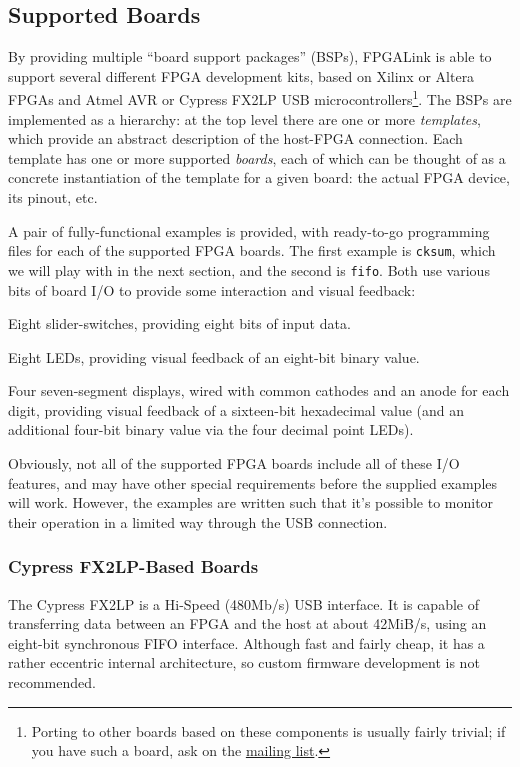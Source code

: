 \subsection{Supported Boards}
By providing multiple ``board support packages'' (BSPs), FPGALink is able to support several different FPGA development kits, based on Xilinx or Altera FPGAs and Atmel AVR or Cypress FX2LP USB microcontrollers\footnote{Porting to other boards based on these components is usually fairly trivial; if you have such a board, ask on the \href{http://groups.google.com/group/fpgalink-users}{mailing list}.}. The BSPs are implemented as a hierarchy: at the top level there are one or more \textit{templates}, which provide an abstract description of the host-FPGA connection. Each template has one or more supported \textit{boards}, each of which can be thought of as a concrete instantiation of the template for a given board: the actual FPGA device, its pinout, etc.

A pair of fully-functional examples is provided, with ready-to-go programming files for each of the supported FPGA boards. The first example is \texttt{cksum}, which we will play with in the next section, and the second is \texttt{fifo}. Both use various bits of board I/O to provide some interaction and visual feedback:

\begin{blobs}
  \item
    Eight slider-switches, providing eight bits of input data.
  \item
    Eight LEDs, providing visual feedback of an eight-bit binary value.
  \item
    Four seven-segment displays, wired with common cathodes and an anode for each digit, providing visual feedback of a sixteen-bit hexadecimal value (and an additional four-bit binary value via the four decimal point LEDs).
\end{blobs}

Obviously, not all of the supported FPGA boards include all of these I/O features, and may have other special requirements before the supplied examples will work. However, the examples are written such that it's possible to monitor their operation in a limited way through the USB connection.

\subsubsection{Cypress FX2LP-Based Boards}

The Cypress FX2LP is a Hi-Speed (480Mb/s) USB interface. It is capable of transferring data between an FPGA and the host at about 42MiB/s, using an eight-bit synchronous FIFO interface. Although fast and fairly cheap, it has a rather eccentric internal architecture, so custom firmware development is not recommended.

